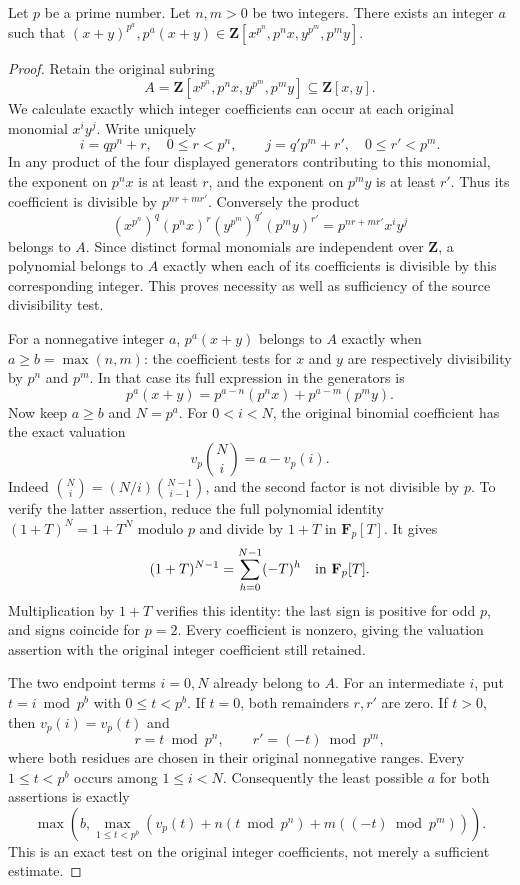 \begin{lemma}
\label{editorial-source-lemma-help-with-powers}
Let $p$ be a prime number. Let $n, m > 0$ be two integers. There exists
an integer $a$ such that
$(x + y)^{p^a}, p^a(x + y) \in \mathbf{Z}[x^{p^n}, p^nx, y^{p^m}, p^my]$.
\end{lemma}

\begin{proof}
Retain the original subring
$$
A=\mathbf Z[x^{p^n},p^n x,y^{p^m},p^m y]
\subseteq\mathbf Z[x,y].
$$
We calculate exactly which integer
coefficients can occur at each original
monomial $x^i y^j$. Write uniquely
$$
i=q p^n+r,\quad 0\leq r<p^n,
\qquad j=q' p^m+r',\quad 0\leq r'<p^m.
$$
In any product of the four displayed
generators contributing to this
monomial, the exponent on $p^n x$
is at least $r$, and the exponent
on $p^m y$ is at least $r'$.
Thus its coefficient is divisible
by $p^{nr+mr'}$. Conversely the
product
$$
(x^{p^n})^q(p^n x)^r
(y^{p^m})^{q'}(p^m y)^{r'}
=p^{nr+mr'}x^i y^j
$$
belongs to $A$. Since distinct formal
monomials are independent over
$\mathbf Z$, a polynomial belongs
to $A$ exactly when each of its
coefficients is divisible by this
corresponding integer. This proves
necessity as well as sufficiency
of the source divisibility test.

For a nonnegative integer $a$,
$p^a(x+y)$ belongs to $A$ exactly
when $a\geq b=\max(n,m)$: the
coefficient tests for $x$ and $y$
are respectively divisibility by
$p^n$ and $p^m$. In that case its
full expression in the generators is
$$
p^a(x+y)=p^{a-n}(p^n x)+p^{a-m}(p^m y).
$$
Now keep $a\geq b$ and $N=p^a$.
For $0<i<N$, the original binomial
coefficient has the exact valuation
$$
v_p\binom Ni=a-v_p(i).
$$
Indeed
$\binom Ni=(N/i)\binom{N-1}{i-1}$,
and the second factor is not divisible
by $p$. To verify the latter assertion,
reduce the full polynomial identity
$(1+T)^N=1+T^N$ modulo $p$ and divide
by $1+T$ in $\mathbf F_p[T]$.
It gives
$$
(1+T)^{N-1}=\sum_{h=0}^{N-1}(-T)^h
\quad\hbox{in }\mathbf F_p[T].
$$
Multiplication by $1+T$ verifies this
identity: the last sign is positive
for odd $p$, and signs coincide for
$p=2$. Every coefficient is nonzero,
giving the valuation assertion with
the original integer coefficient
still retained.

The two endpoint terms $i=0,N$
already belong to $A$. For an
intermediate $i$, put $t=i\bmod p^b$
with $0\leq t<p^b$. If $t=0$, both
remainders $r,r'$ are zero. If $t>0$,
then $v_p(i)=v_p(t)$ and
$$
r=t\bmod p^n,\qquad
r'=(-t)\bmod p^m,
$$
where both residues are chosen in
their original nonnegative ranges.
Every $1\leq t<p^b$ occurs among
$1\leq i<N$. Consequently the least
possible $a$ for both assertions
is exactly
$$
\max\left(b,
\max_{1\leq t<p^b}
\left(v_p(t)+n(t\bmod p^n)+m((-t)\bmod p^m)\right)\right).
$$
This is an exact test on the
original integer coefficients,
not merely a sufficient estimate.


\end{proof}
